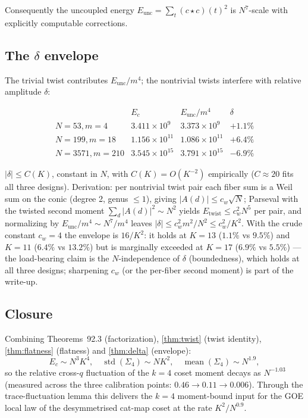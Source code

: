 Consequently the uncoupled energy $E_{\mathrm{unc}} =
\sum_t (c \star c)(t)^2$ is $N^7$-scale with explicitly computable
corrections.

\subsection{The \texorpdfstring{$\delta$}{delta} envelope}

The trivial twist contributes $E_{\mathrm{unc}}/m^4$; the nontrivial
twists interfere with relative amplitude $\delta$:

\[
\begin{array}{lccc}
 & E_c & E_{\mathrm{unc}}/m^4 & \delta\\
N = 53, m = 4 & 3.411 \times 10^9 & 3.373 \times 10^9 & +1.1\%\\
N = 199, m = 18 & 1.156 \times 10^{11} & 1.086 \times 10^{11} & +6.4\%\\
N = 3571, m = 210 & 3.545 \times 10^{15} & 3.791 \times 10^{15} & -6.9\%
\end{array}
\]

\begin{theorem}
\label{thm:delta}
$|\delta| \le C(K)$, constant in $N$, with $C(K) = O(K^{-2})$
empirically ($C \approx 20$ fits all three designs).  Derivation: per
nontrivial twist pair each fiber sum is a Weil sum on the conic
(degree 2, genus $\le 1$), giving $|A(d)| \le c_w\sqrt{N}$; Parseval
with the twisted second moment $\sum_d |A(d)|^2 \sim N^2$ yields
$E_{\mathrm{twist}} \le c_w^2 N^5$ per pair, and normalizing by
$E_{\mathrm{unc}}/m^4 \sim N^7/m^4$ leaves $|\delta| \le c_w^2
m^2/N^2 \le c_w^2/K^2$.  With the crude constant $c_w = 4$ the
envelope is $16/K^2$: it holds at $K = 13$ ($1.1\%$ vs $9.5\%$) and
$K = 11$ ($6.4\%$ vs $13.2\%$) but is marginally exceeded at $K = 17$
($6.9\%$ vs $5.5\%$) --- the load-bearing claim is the
$N$-independence of $\delta$ (boundedness), which holds at all three
designs; sharpening $c_w$ (or the per-fiber second moment) is part of
the write-up.
\end{theorem}

\subsection{Closure}

\begin{corollary}[H3 at $k = 4$]
\label{cor:h3closed}
Combining Theorems~92.3 (factorization), \ref{thm:twist} (twist
identity), \ref{thm:flatness} (flatness) and \ref{thm:delta}
(envelope):
\[
  E_c \sim N^3 K^4, \quad
  \operatorname{std}(\Sigma_4) \sim N K^2, \quad
  \operatorname{mean}(\Sigma_4) \sim N^{1.9},
\]
so the relative cross-$q$ fluctuation of the $k{=}4$ coset moment
decays as $N^{-1.03}$ (measured across the three calibration points:
$0.46 \to 0.11 \to 0.006$).  Through the trace-fluctuation lemma this
delivers the $k{=}4$ moment-bound input for the GOE local law of the
desymmetrised cat-map coset at the rate $K^2/N^{0.9}$.
\end{corollary}

